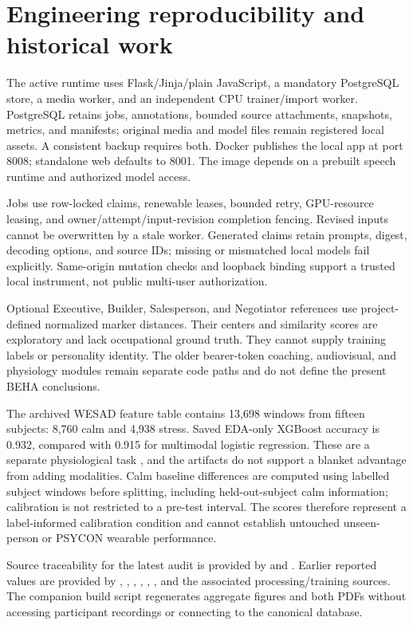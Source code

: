 \documentclass{article}
\begin{document}
\appendix
\section{Engineering reproducibility and historical work}
The active runtime uses Flask/Jinja/plain JavaScript, a mandatory PostgreSQL store, a media worker, and an independent CPU trainer/import worker. PostgreSQL retains jobs, annotations, bounded source attachments, snapshots, metrics, and manifests; original media and model files remain registered local assets. A consistent backup requires both. Docker publishes the local app at port 8008; standalone web defaults to 8001. The image depends on a prebuilt speech runtime and authorized model access.

Jobs use row-locked claims, renewable leases, bounded retry, GPU-resource leasing, and owner/attempt/input-revision completion fencing. Revised inputs cannot be overwritten by a stale worker. Generated claims retain prompts, digest, decoding options, and source IDs; missing or mismatched local models fail explicitly. Same-origin mutation checks and loopback binding support a trusted local instrument, not public multi-user authorization.

Optional Executive, Builder, Salesperson, and Negotiator references use project-defined normalized marker distances. Their centers and similarity scores are exploratory and lack occupational ground truth. They cannot supply training labels or personality identity. The older bearer-token coaching, audiovisual, and physiology modules remain separate code paths and do not define the present BEHA conclusions.

The archived WESAD feature table contains 13,698 windows from fifteen subjects: 8,760 calm and 4,938 stress. Saved EDA-only XGBoost accuracy is 0.932, compared with 0.915 for multimodal logistic regression. These are a separate physiological task \cite{schmidt2018wesad}, and the artifacts do not support a blanket advantage from adding modalities. Calm baseline differences are computed using labelled subject windows before splitting, including held-out-subject calm information; calibration is not restricted to a pre-test interval. The scores therefore represent a label-informed calibration condition and cannot establish untouched unseen-person or PSYCON wearable performance.

Source traceability for the latest audit is provided by  and . Earlier reported values are provided by , , , , , , and the associated processing/training sources. The companion build script regenerates aggregate figures and both PDFs without accessing participant recordings or connecting to the canonical database.



\end{document}
